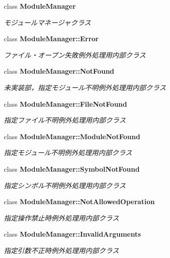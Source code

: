 \begin{CompactItemize}
\item 
class {\bf ModuleManager}
\begin{CompactList}\small\item\em モジュールマネージャクラス \item\end{CompactList}\item 
class {\bf ModuleManager::Error}
\begin{CompactList}\small\item\em ファイル・オープン失敗例外処理用内部クラス \item\end{CompactList}\item 
class {\bf ModuleManager::NotFound}
\begin{CompactList}\small\item\em 未実装部，指定モジュール不明例外処理用内部クラス \item\end{CompactList}\item 
class {\bf ModuleManager::FileNotFound}
\begin{CompactList}\small\item\em 指定ファイル不明例外処理用内部クラス \item\end{CompactList}\item 
class {\bf ModuleManager::ModuleNotFound}
\begin{CompactList}\small\item\em 指定モジュール不明例外処理用内部クラス \item\end{CompactList}\item 
class {\bf ModuleManager::SymbolNotFound}
\begin{CompactList}\small\item\em 指定シンボル不明例外処理用内部クラス \item\end{CompactList}\item 
class {\bf ModuleManager::NotAllowedOperation}
\begin{CompactList}\small\item\em 指定操作禁止時例外処理用内部クラス \item\end{CompactList}\item 
class {\bf ModuleManager::InvalidArguments}
\begin{CompactList}\small\item\em 指定引数不正時例外処理用内部クラス \item\end{CompactList}\item 

\end{CompactItemize}
